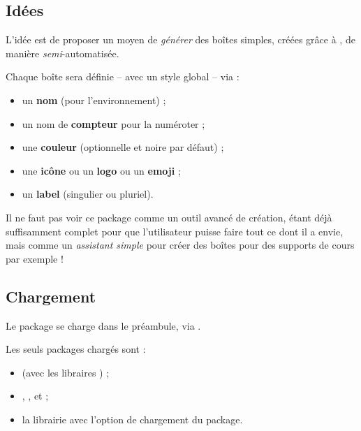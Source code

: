 \documentclass[french,11pt,a4paper]{article}
\begin{document}
\subsection{Idées}

L'idée est de proposer un moyen de \textit{générer} des boîtes simples, créées grâce à , de manière \textit{semi}-automatisée.

\smallskip

Chaque boîte sera définie -- avec un style global -- via :

\begin{itemize}
	\item un \textbf{nom} (pour l'environnement) ;
	\item un nom de \textbf{compteur} pour la numéroter ;
	\item une \textbf{couleur} (optionnelle et noire par défaut) ;
	\item une \textbf{icône} ou un \textbf{logo} ou un \textbf{emoji} ;
	\item un \textbf{label} (singulier ou pluriel).
\end{itemize}

\medskip

Il ne faut pas voir ce package comme un outil avancé de création,  étant déjà suffisamment complet pour que l'utilisateur puisse faire tout ce dont il a envie, mais comme un \textit{assistant simple} pour créer des boîtes pour des supports de cours par exemple !

\subsection{Chargement}

Le package se charge dans le préambule, via .

Les seuls packages chargés sont :

\begin{itemize}
	\item {} (avec les libraires ) ;
	\item {}, ,  et  ;
	\item la librairie  avec l'option \MontreCode{[breakable]} de chargement du package.
\end{itemize}

\begin{codehigh}[language=latex/latex2,style/main=cyan!10,style/code=cyan!10]
\usepackage{CreationBoites}                    %
\usepackage[fa6]{CreationBoites}               %
\end{codehigh}
\end{document}
